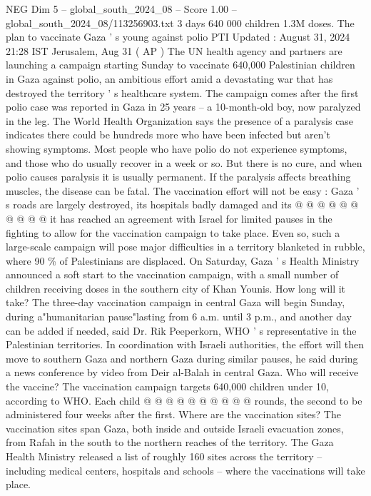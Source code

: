 \begin{textsample}{NEG Dim 5 – global\_south\_2024\_08 – Score 1.00 – global\_south\_2024\_08/113256903.txt}  \label{ex:f5_neg_175}
3 days 640 000 children 1.3M doses.
The plan to vaccinate Gaza ' s young against polio PTI Updated : August 31, 2024 21:28 IST Jerusalem, Aug 31 ( AP ) The UN health agency and partners are launching a campaign starting Sunday to vaccinate 640,000 Palestinian children in Gaza against polio, an ambitious effort amid a devastating war that has destroyed the territory ' s healthcare system.
The campaign comes after the first polio case was reported in Gaza in 25 years -- a 10-month-old boy, now paralyzed in the leg.
The World Health Organization says the presence of a paralysis case indicates there could be hundreds more who have been infected but aren't showing symptoms.
Most people who have polio do not experience symptoms, and those who do usually recover in a week or so.
But there is no cure, and when polio causes paralysis it is usually permanent.
If the paralysis affects breathing muscles, the disease can be fatal.
The vaccination effort will not be easy : Gaza ' s roads are largely destroyed, its hospitals badly damaged and its @ @ @ @ @ @ @ @ @ @ it has reached an agreement with Israel for limited pauses in the fighting to allow for the vaccination campaign to take place.
Even so, such a large-scale campaign will pose major difficulties in a territory blanketed in rubble, where 90 \% of Palestinians are displaced.
On Saturday, Gaza ' s Health Ministry announced a soft start to the vaccination campaign, with a small number of children receiving doses in the southern city of Khan Younis.
How long will it take?
The three-day vaccination campaign in central Gaza will begin Sunday, during a"humanitarian pause"lasting from 6 a.m. until 3 p.m., and another day can be added if needed, said Dr.
Rik Peeperkorn, WHO ' s representative in the Palestinian territories.
In coordination with Israeli authorities, the effort will then move to southern Gaza and northern Gaza during similar pauses, he said during a news conference by video from Deir al-Balah in central Gaza.
Who will receive the vaccine?
The vaccination campaign targets 640,000 children under 10, according to WHO.
Each child @ @ @ @ @ @ @ @ @ @ rounds, the second to be administered four weeks after the first.
Where are the vaccination sites?
The vaccination sites span Gaza, both inside and outside Israeli evacuation zones, from Rafah in the south to the northern reaches of the territory.
The Gaza Health Ministry released a list of roughly 160 sites across the territory -- including medical centers, hospitals and schools -- where the vaccinations will take place.

\end{textsample}
